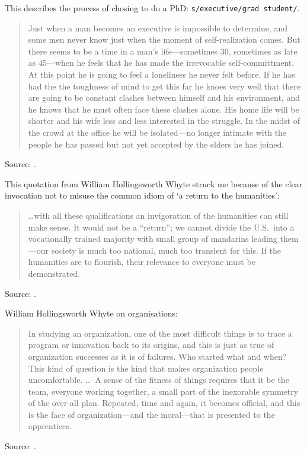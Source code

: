 \documentclass[a4paper]{article}
\begin{document}
This describes the process of chosing to do a PhD: \verb,s/executive/grad student/,.
\begin{quote}
	Just when a man becomes an executive is impossible to determine, and some men never know just
when the moment of self-realization comes.  But there seems to be a time in a man's
life---sometimes 30, sometimes as late as 45---when he feels that he has made the irrevocable
self-committment.  At this point he is going to feel a loneliness he never felt before.  If he has
had the the toughness of mind to get this far he knoes very well that there are going to be
constant clashes between himself and his environment, and he knows that he must often face these
clashes alone.  His home life will be shorter and his wife less and less interested in the
struggle.  In the midst of the crowd at the office he will be isolated---no longer intimate with
the people he has passed but not yet accepted by the elders he has joined.
\end{quote}
Source: \citet[p.~157]{Whyte1956}.
\medskip

This quotation from William Hollingsworth Whyte struck me because of the clear invocation not to
misuse the common idiom of `a return to the humanities':
\begin{quote}
	\ldots with all these qualifications an invigoration of the humanities can still make sense.
It would not be a ``return''; we cannot divide the U.S.\ into a vocationally trained majority with
small group of mandarins leading them---our society is much too national, much too transient for
this.  If the humanities are to flourish, their relevance to everyone must be demonstrated.
\end{quote}
Source: \cite[p.~97]{Whyte1956}.
\medskip

William Hollingsworth Whyte on organisations:
\begin{quote}
	In studying an organization, one of the most difficult things is to trace a program or
innovation back to its origins, and this is just as true of organization successes as it is of
failures.  Who started what and when?  This kind of question is the kind that makes organization
people uncomfortable. \ldots\  A sense of the fitness of things requires that it be the team,
everyone working together, a small part of the inexorable symmetry of the over-all plan.  Repeated,
time and again, it becomes official, and this is the face of organization---and the moral---that is
presented to the apprentices.
\end{quote}
Source: \cite[p.~53]{Whyte1956}.
\medskip
\end{document}
